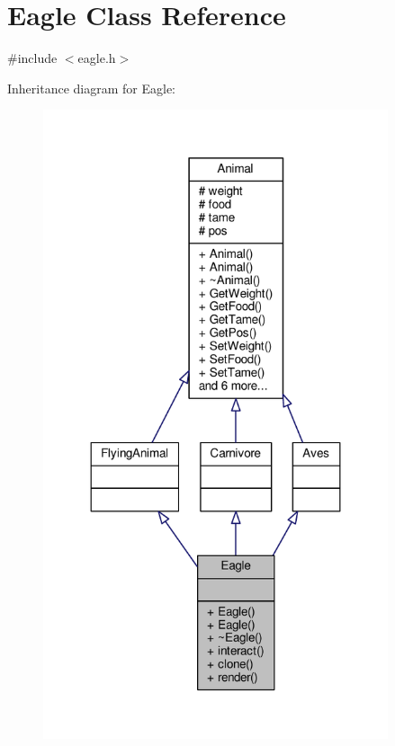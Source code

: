 \hypertarget{classEagle}{}\section{Eagle Class Reference}
\label{classEagle}


{\ttfamily \#include $<$eagle.\+h$>$}



Inheritance diagram for Eagle\+:
\nopagebreak
\begin{figure}[H]
\begin{center}
\leavevmode
\includegraphics[width=287pt]{classEagle__inherit__graph}
\end{center}
\end{figure}


